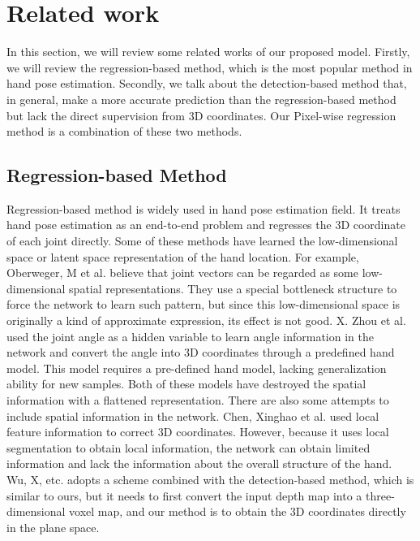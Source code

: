 \documentclass[journal]{IEEEtran}
\begin{document}
\section{Related work}
\label{Related_Work}

In this section, we will review some related works of our proposed model. 
Firstly, we will review the regression-based method, which is the most popular method in hand pose estimation. 
Secondly, we talk about the detection-based method that, in general, 
make a more accurate prediction than the regression-based method but lack the direct supervision from 3D coordinates. 
Our Pixel-wise regression method is a combination of these two methods.

\subsection{Regression-based Method}

Regression-based method\cite{tang2017latent, ge2019real, chen2018shpr, hu2019a, wu2018context, chen2018learning, oberweger2017deepprior, zhou2016model, chen2017pose, wu2018handmap} is widely used in hand pose estimation field. 
It treats hand pose estimation as an end-to-end problem and regresses the 3D coordinate of each joint directly. 
Some of these methods have learned the low-dimensional space or latent space representation of the hand location. 
For example, Oberweger, M et al.\cite{oberweger2017deepprior} believe that joint vectors can be regarded as some low-dimensional spatial representations. 
They use a special bottleneck structure to force the network to learn such pattern, 
but since this low-dimensional space is originally a kind of approximate expression, its effect is not good. 
X. Zhou et al.\cite{zhou2016model} used the joint angle as a hidden variable to learn angle information in the network and 
convert the angle into 3D coordinates through a predefined hand model. This model requires a pre-defined hand model, lacking generalization ability for new samples. 
Both of these models have destroyed the spatial information with a flattened representation. 
There are also some attempts to include spatial information in the network. 
Chen, Xinghao et al.\cite{chen2017pose} used local feature information to correct 3D coordinates. 
However, because it uses local segmentation to obtain local information, the network can obtain limited information and lack the information about the overall structure of the hand. 
Wu, X, etc.\cite{wu2018handmap} adopts a scheme combined with the detection-based method, 
which is similar to ours, but it needs to first convert the input depth map into a three-dimensional voxel map, 
and our method is to obtain the 3D coordinates directly in the plane space.
\end{document}
